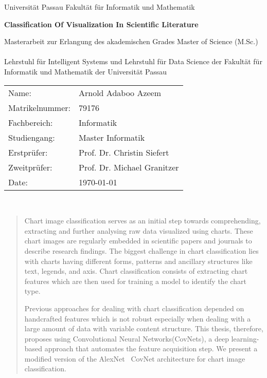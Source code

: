 \begin{titlepage}
	Universität Passau\newline
	Fakultät für Informatik und Mathematik
	\vspace{2.5cm}
    \begin{center}
    \LARGE\textbf{{Classification  Of Visualization In Scientific Literature}}\\
   
    \normalsize

    \vspace{2.5cm}
    \end{center}

 \normalsize{
 	Masterarbeit zur Erlangung des akademischen Grades\newline
 	Master of Science (M.Sc.)\newline
 	\ \\
 	Lehrstuhl für Intelligent Systems und Lehrstuhl für Data Science \newline
 	der Fakultät für Informatik und Mathematik\newline
 	der Universität Passau\newline
 	
 
    \begin{tabular}{ll}
    	Name: & Arnold Adaboo Azeem \\
    	Matrikelnummer: & 79176 \\
    	Fachbereich: & Informatik\\
    	Studiengang: & Master Informatik\\
	Erstprüfer: & Prof. Dr. Christin Siefert \\
	Zweitprüfer: & Prof. Dr. Michael Granitzer\\
	Date: &     \today
    \end{tabular}\\
    }


\newpage
\begin{abstract}
Chart image classification serves as an initial step towards comprehending, extracting and further analysing raw data visualized using charts. These chart images are regularly embedded in scientific papers and journals to describe research findings. The biggest challenge in chart classification lies with charts having different forms, patterns and ancillary structures like text, legends, and axis. Chart classification consists of extracting chart features which are then used for training a model to identify the chart type.

Previous approaches for dealing with chart classification depended on handcrafted features which is not robust especially when dealing with a large amount of data with variable content structure. This thesis, therefore, proposes using Convolutional Neural Networks(CovNets), a deep learning-based approach that automates the feature acquisition step. We present a modified version of the AlexNet~\cite{krizhevsky2012imagenet} CovNet architecture for chart image classification. 


\end{abstract}
\end{titlepage}

